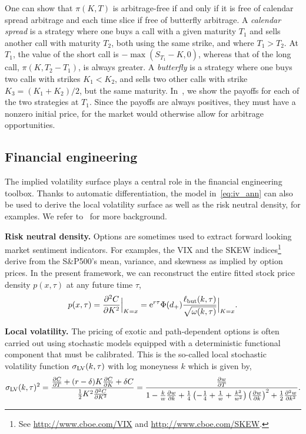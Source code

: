 One can show that $\pi(K,T)$ is arbitrage-free if and only if it is free of calendar spread arbitrage and each time slice if free of butterfly arbitrage.
A \emph{calendar spread} is a strategy where one buys a call with a given maturity $T_1$ and sells another call with maturity $T_2$, both using the same strike, and where $T_1 > T_2$.
At $T_1$, the value of the short call is $-\max(S_{T_1} - K, 0)$, whereas that of the long call, $\pi(K, T_2 - T_1)$, is always greater.
A \emph{butterfly} is a strategy where one buys two calls with strikes $K_1 < K_2$, and sells two other calls with strike $K_3 = (K_1 + K_2)/2$, but the same maturity.
In~, we show the payoffs for each of the two strategies at $T_1$.
Since the payoffs are always positives, they must have a nonzero initial price, for the market would otherwise allow for arbitrage opportunities.

\subsection{Financial engineering} \label{sec:fineng}

The implied volatility surface plays a central role in the financial engineering toolbox.
Thanks to automatic differentiation, the model in~\eqref{eq:iv_ann} can also be used to derive the local volatility surface as well as the risk neutral density, for examples.
We refer to~\cite[Chapter~1]{gatheral2011volatility} for more background.

\textbf{Risk neutral density.}
Options are sometimes used to extract forward looking market sentiment indicators.
For examples, the VIX and the SKEW indices\footnote{See \url{http://www.cboe.com/VIX} and \url{http://www.cboe.com/SKEW}.} derive from the S\&P500's mean, variance, and skewness as implied by option prices.
In the present framework, we can reconstruct the entire fitted stock price density $p(x,\tau)$ at any future time $\tau$,
\begin{equation*}
p(x,\tau) = \frac{\partial^2 C }{ \partial K^2} \Big\lvert_{K=x} = {\rm e}^{r\tau} \Phi(d_+) \frac{\ell_{\rm but}(k,\tau)}{\sqrt{\omega (k, \tau)}}\Big\lvert_{K=x}.
\end{equation*}

\textbf{Local volatility.} 
The pricing of exotic and path-dependent options is often carried out using stochastic models equipped with a deterministic functional component that must be calibrated.
This is the so-called local stochastic volatility function $\sigma_{\rm LV}(k,\tau)$ with log moneyness $k$ which is given by, 
\begin{equation*}
\sigma_{\rm LV}(k,\tau)^2 
 = \frac{\frac{\partial C}{\partial T} + (r - \delta)K \frac{\partial C}{\partial K} + \delta C}{ \frac{1}{2} K^2 \frac{\partial^2C}{\partial K^2}} = \frac{ \frac{\partial w}{\partial T} }{1 - \frac{k}{w} \frac{\partial w}{\partial k}+  \frac{1}{4}\left( -  \frac{1}{4} +  \frac{1}{w} +  \frac{k^2}{w^2} \right) \left(\frac{\partial w}{\partial k}\right)^2 + \frac{1}{2}\frac{\partial^2 w}{\partial k^2} }.
\end{equation*}

